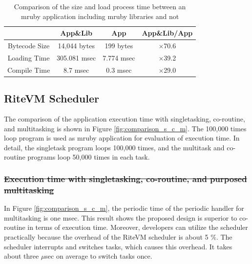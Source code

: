 \documentclass{sig-alternate-05-2015}
\providecommand{\DIFdel}[1]{{\protect\color{red}\sout{#1}}}                      %
\providecommand{\DIFaddbegin}{} %
\providecommand{\DIFaddend}{} %
\providecommand{\DIFdelbegin}{} %
\providecommand{\DIFdelend}{} %
\begin{document}
\begin{table}[t]
    \centering
    \vspace{1mm}
\caption{Comparison of the size and load process time between an mruby application including mruby libraries and not}
    \vspace{1mm}
    {\tabcolsep=0.1cm
    \begin{tabular}{c||c|c|c}
                            & App\&Lib     & App        &   App\&Lib/App  \\ \hline
          Bytecode Size     & 14,044 bytes & 199 bytes  &   $\times$70.6          \\ %
          Loading Time      & 305.081 msec & 7.774 msec &   $\times$39.2          \\
          Compile Time  & 8.7 msec     & 0.3 msec   &   $\times$29.0          \\
    \end{tabular}
    }
    \label{tab:size_and_time}
\end{table}

\subsection{RiteVM Scheduler}
The comparison of the application execution time with singletasking, co-routine, and multitasking is shown in Figure \ref{fig:comparison_s_c_m}.
The 100,000 times loop program is used as mruby application for evaluation of execution time.
In detail, the singletask program loops 100,000 times, and the multitask and co-routine programs loop 50,000 times in each task.
\DIFdelbegin \subsubsection{\DIFdel{Execution time with singletasking, co-routine, and purposed multitasking}}
\addtocounter{subsubsection}{-1}%
\DIFdelend \DIFaddbegin 

\DIFaddend In Figure \ref{fig:comparison_s_c_m}, the periodic time of the periodic handler for multitasking is one msec.
This result shows the proposed design is superior to co-routine in terms of execution time.
Moreover, developers can utilize the scheduler practically because the overhead of the RiteVM scheduler is about 5 \%.
The scheduler interrupts and switches tasks, which causes this overhead.
It takes about three $\mu$sec on average to switch tasks once.
\end{document}
